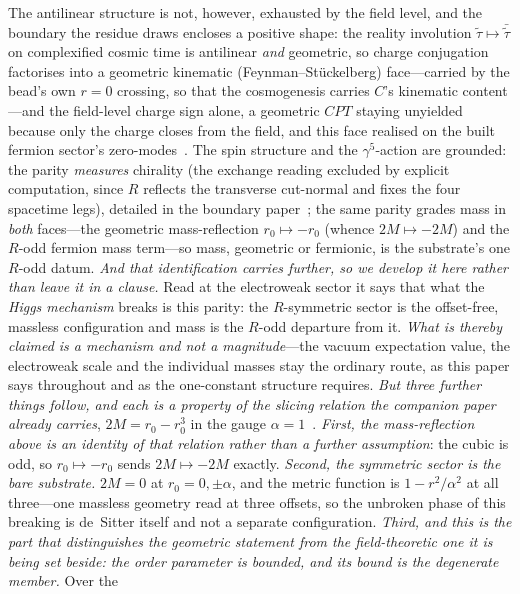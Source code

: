 \documentclass[11pt,a4paper]{article}
\theoremstyle{definition}
\begin{document}
\begin{enumerate}
The antilinear structure is not, however, exhausted by the field level, and the boundary the residue draws encloses a positive shape: the reality involution $\tilde\tau\mapsto\bar{\tilde\tau}$ on complexified cosmic time is antilinear \emph{and} geometric, so charge conjugation factorises into a geometric kinematic (Feynman--St\"uckelberg) face---carried by the bead's own $r=0$ crossing, so that the cosmogenesis carries $C$'s kinematic content---and the field-level charge sign alone, a geometric $CPT$ staying unyielded because only the charge closes from the field, and this face realised on the built fermion sector's zero-modes~\cite{JanzenBoundary,JanzenMatter}.
The spin structure and the $\gamma^5$-action are grounded:
the parity \emph{measures} chirality (the exchange reading excluded by explicit
computation, since $R$ reflects the transverse cut-normal and fixes the four
spacetime legs), detailed in the boundary paper~\cite{JanzenBoundary}; the
same parity grades mass in \emph{both} faces---the geometric mass-reflection
$r_0\mapsto-r_0$ (whence $2M\mapsto-2M$) and the $R$-odd fermion mass term---so
mass, geometric or fermionic, is the substrate's one $R$-odd datum.
\emph{And that identification carries further, so we develop it here rather than leave it in a clause.} Read at the electroweak sector it says that what the \emph{Higgs mechanism} breaks is this
parity: the $R$-symmetric sector is the offset-free, massless configuration and mass is the $R$-odd departure
from it. \emph{What is thereby claimed is a mechanism and not a magnitude}---the vacuum expectation value, the
electroweak scale and the individual masses stay the ordinary route, as this paper says throughout and as the
one-constant structure requires. \emph{But three further things follow, and each is a
property of the slicing relation the companion paper already
carries}, $2M=r_{0}-r_{0}^{3}$ in the gauge $\alpha=1$~\cite{JanzenSlicing}.
\emph{First, the mass-reflection above is an identity of that relation rather than a further assumption}: the
cubic is odd, so $r_{0}\mapsto-r_{0}$ sends $2M\mapsto-2M$ exactly.
\emph{Second, the symmetric sector is the bare substrate.} $2M=0$ at $r_{0}=0,\pm\alpha$, and the metric
function is $1-r^{2}/\alpha^{2}$ at all three---one massless geometry read at three offsets, so the unbroken
phase of this breaking is de~Sitter itself and not a separate configuration.
\emph{Third, and this is the part that distinguishes the geometric statement from the field-theoretic one it
is being set beside: the order parameter is bounded, and its bound is the degenerate member.} Over the

\end{enumerate}
\end{document}
